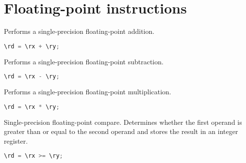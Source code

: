 
\section{Floating-point instructions}

Performs a single-precision floating-point addition.

\begin{lstlisting}[numbers=none, basicstyle=\ttfamily\footnotesize, language=C++]
\rd = \rx + \ry;
\end{lstlisting}

Performs a single-precision floating-point subtraction.

\begin{lstlisting}[numbers=none, basicstyle=\ttfamily\footnotesize, language=C++]
\rd = \rx - \ry;
\end{lstlisting}

Performs a single-precision floating-point multiplication.

\begin{lstlisting}[numbers=none, basicstyle=\ttfamily\footnotesize, language=C++]
\rd = \rx * \ry;
\end{lstlisting}

Single-precision floating-point compare. Determines whether the first operand is greater than or equal to the second operand and stores
the result in an integer register.

\begin{lstlisting}[numbers=none, basicstyle=\ttfamily\footnotesize, language=C++]
\rd = \rx >= \ry;
\end{lstlisting}

